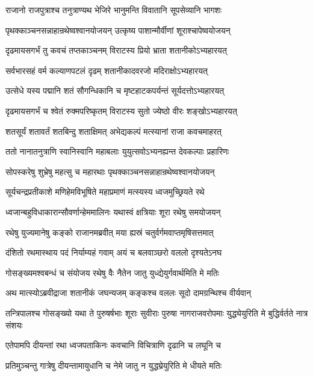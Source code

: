 \twolineshloka
{राजानो राजपुत्राश्च तनुत्राण्यथ भेजिरे}
{भानुमन्ति विवातानि सूपसेव्यानि भागशः}


\twolineshloka
{पृथक्काञ्चनसन्नाहान्रथेष्वश्वानयोजयन्}
{उत्कृष्य पाशान्मौर्वीणां शूराश्चापेष्वयोजयन्}


\twolineshloka
{दृढमायसगर्भं तु कवचं तप्तकाञ्चनम्}
{विराटस्य प्रियो भ्राता शतानीकोऽभ्यहारयत्}


\twolineshloka
{सर्वभारसहं वर्म कल्याणपटलं दृढम्}
{शतानीकादवरजो मदिराक्षोऽभ्यहारयत्}


\twolineshloka
{उत्सेधे यस्य पद्मानि शतं सौगन्धिकानि च}
{मृष्टहाटकपर्यन्तं सूर्यदत्तोऽभ्यहारयत्}


\twolineshloka
{दृढमायसगर्भं च श्वेतं रुक्मपरिष्कृतम्}
{विराटस्य सुतो ज्येष्ठो वीरः शङ्खोऽभ्यहारयत्}


\twolineshloka
{शतसूर्यं शतावर्तं शतबिन्दु शताक्षिमत्}
{अभेद्यकल्पं मत्स्यानां राजा कवचमाहरत्}


\twolineshloka
{ततो नानातनुत्राणि स्वानिस्वानि महाबलाः}
{युयुत्सवोऽभ्यनह्यन्त देवकल्पाः प्रहारिणः}


\twolineshloka
{सोपस्करेषु शुभ्रेषु महत्सु च महारथाः}
{पृथक्काञ्चनसन्नाहान्रथेष्वश्वानयोजयन्}


\twolineshloka
{सूर्यचन्द्रप्रतीकाशे मणिहेमविभूषिते}
{महाप्रमाणं मत्स्यस्य ध्वजमुच्छ्रियते रथे}


\twolineshloka
{ध्वजान्बहुविधाकारान्सौवर्णान्हेममालिनः}
{यथास्वं क्षत्रियाः शूरा रथेषु समयोजयन्}


\twolineshloka
{रथेषु युज्यमानेषु कङ्को राजानमब्रवीत्}
{मया ह्यस्रं चतुर्वर्गमवाप्तमृषिसत्तमात्}


\twolineshloka
{दंशितो रथमास्थाय पदं निर्याम्यहं गवाम्}
{अयं च बलवाञ्छरो वललो दृश्यतेऽनघ}


\twolineshloka
{गोसङ्ख्यमश्वबन्धं च संयोजय रथेषु वैः}
{नैतेन जातु युध्द्येयुर्गवार्थमिति मे मतिः}



\twolineshloka
{अथ मात्स्योऽब्रवीद्राजा शतानीकं जघन्यजम्}
{कङ्कश्च वललः सूदो दामग्रन्थिश्च वीर्यवान्}


\threelineshloka
{तन्त्रिपालश्च गोसङ्ख्यो यथा ते पुरुषर्षभाः}
{शूराः सुवीराः पुरुषा नागराजवरोपमाः}
{युद्ध्येयुरिति मे बुद्धिर्वर्तते नात्र संशयः}


\twolineshloka
{एतेपामपि दीयन्तां रथा ध्वजपताकिनः}
{कवचानि विचित्राणि दृढानि च लघूनि च}


\twolineshloka
{प्रतिमुञ्चन्तु गात्रेषु दीयन्तामायुधानि च}
{नेमे जातु न युद्ध्य्रेयुरिति मे धीयते मतिः}


